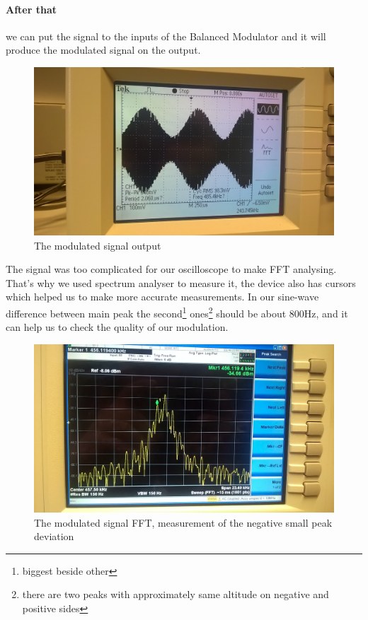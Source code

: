 \documentclass[english]{article}
\begin{document}
\paragraph{After that} we can put the signal to the inputs of the Balanced Modulator and it will produce the modulated signal on the output.
\begin{figure}[H]
\centerline{\includegraphics[scale=0.1]{AM/4Modul2}}
\caption{The modulated signal output}
\end{figure}
The signal was too complicated for our oscilloscope to make FFT analysing. That's why we used spectrum analyser to measure it, the device also has cursors which helped us to make more accurate measurements. In our sine-wave difference between main peak the second\footnote{biggest beside other} ones\footnote{there are two peaks with approximately same altitude on negative and positive sides} should be about 800Hz, and it can help us to check the quality of our modulation.
\begin{figure}[H]
\centerline{\includegraphics[scale=0.1]{AM/WP_20140925_021}}
\caption{The modulated signal FFT, measurement of the negative small peak deviation}
\end{figure}
\end{document}
